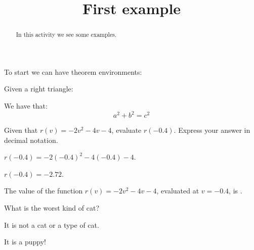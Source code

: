 \documentclass[numbers]{ximera}
\title{First example}
\begin{document}
\begin{abstract}
In this activity we see some examples.
\end{abstract}
\maketitle

To start we can have theorem environments:

\begin{theorem}
Given a right triangle:
\begin{image}
\end{image}
We have that:
\[
a^2 + b^2 = c^2
\]
\end{theorem}

\begin{exercise}
Given that $r(v)=-2 v^2-4 v-4$, evaluate $r(-0.4)$. Express your answer in decimal notation.
\begin{solution}
\begin{hint}
$r(-0.4)=-2 (-0.4)^2-4 (-0.4)-4$.
\end{hint}
\begin{hint}
$r(-0.4)=-2.72$.
\end{hint}
The value of the function $r(v)=-2 v^2-4 v-4$, evaluated at $v=-0.4$, is .
\end{solution}
\end{exercise}



\begin{question}
What is the worst kind of cat?
\begin{multiple-choice}
\end{multiple-choice}
\begin{solution}
\begin{hint}
It is not a cat or a type of cat.
\end{hint}
\begin{hint}
It is a puppy!
\end{hint}
\end{solution}
\end{question}
\end{document}
